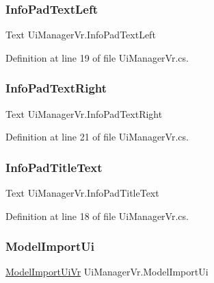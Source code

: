 \subsubsection{\texorpdfstring{InfoPadTextLeft}{InfoPadTextLeft}}
{\footnotesize\ttfamily Text Ui\+Manager\+Vr.\+Info\+Pad\+Text\+Left}



Definition at line 19 of file Ui\+Manager\+Vr.\+cs.

\mbox{\label{class_ui_manager_vr_a92fcb7893989cedb289ac8db08a980e3}} 
\subsubsection{\texorpdfstring{InfoPadTextRight}{InfoPadTextRight}}
{\footnotesize\ttfamily Text Ui\+Manager\+Vr.\+Info\+Pad\+Text\+Right}



Definition at line 21 of file Ui\+Manager\+Vr.\+cs.

\mbox{\label{class_ui_manager_vr_af61e7d3f15782b2eb08bb45a707c23ea}} 
\subsubsection{\texorpdfstring{InfoPadTitleText}{InfoPadTitleText}}
{\footnotesize\ttfamily Text Ui\+Manager\+Vr.\+Info\+Pad\+Title\+Text}



Definition at line 18 of file Ui\+Manager\+Vr.\+cs.

\mbox{\label{class_ui_manager_vr_af9706465d734c91ff22a586b7e754d52}} 
\subsubsection{\texorpdfstring{ModelImportUi}{ModelImportUi}}
{\footnotesize\ttfamily \mbox{\hyperlink{class_model_import_ui_vr}{Model\+Import\+Ui\+Vr}} Ui\+Manager\+Vr.\+Model\+Import\+Ui}



